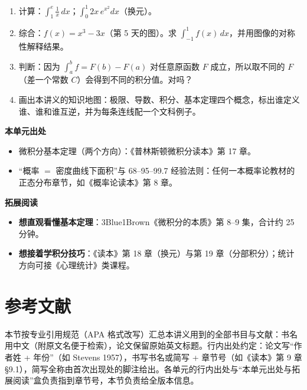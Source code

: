 \documentclass[UTF8,a4paper,11pt]{ctexart}
\begin{document}
\begin{exercise}[一周总检验]
\begin{enumerate}
  \item 计算：$\displaystyle\int_1^{e}\frac{1}{x}\,dx$；$\displaystyle\int_0^1 2x\,e^{x^2}dx$（换元）。
  \item 综合：$f(x)=x^3-3x$（第 5 天的图）。求 $\displaystyle\int_{-1}^{1}f(x)\,dx$，并用图像的对称性解释结果。
  \item 判断：因为 $\int_a^b f = F(b)-F(a)$ 对任意原函数 $F$ 成立，所以取不同的 $F$（差一个常数 $C$）会得到不同的积分值。对吗？
  \item 画出本讲义的知识地图：极限、导数、积分、基本定理四个概念，标出谁定义谁、谁和谁互逆，并为每条连线配一个文科例子。
\end{enumerate}
\end{exercise}

\begin{reading}
\textbf{本单元出处}
\begin{itemize}
  \item 微积分基本定理（两个方向）：《普林斯顿微积分读本》第 17 章。
  \item “概率 $=$ 密度曲线下面积”与 68–95–99.7 经验法则：任何一本概率论教材的正态分布章节，如《概率论读本》第 8 章。
\end{itemize}
\textbf{拓展阅读}
\begin{itemize}
  \item \textbf{想直观看懂基本定理}：3Blue1Brown《微积分的本质》第 8–9 集，合计约 25 分钟。
  \item \textbf{想接着学积分技巧}：《读本》第 18 章（换元）与第 19 章（分部积分）；统计方向可接《心理统计》类课程。
\end{itemize}
\end{reading}

\newpage

\section*{参考文献}

本节按专业引用规范（APA 格式改写）汇总本讲义用到的全部书目与文献：书名用中文（附原文名便于检索），论文保留原始英文标题。行内出处约定：论文写“作者姓 + 年份”（如 Stevens 1957），书写书名或简写 + 章节号（如《读本》第 9 章 §9.1），简写全称由首次出现处的脚注给出。各单元的行内出处与“本单元出处与拓展阅读”盒负责指到章节号，本节负责给全版本信息。
\end{document}
